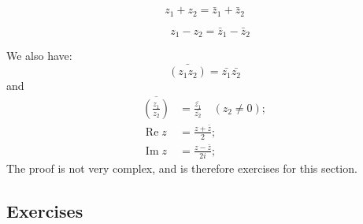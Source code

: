 \documentclass[
	12pt, %
	fleqn, %
	a4paper, %
]{LegrandOrangeBook}
\begin{document}
$$z_1 + z_2 = \bar{z}_1 + \bar{z}_2$$

$$\quad z_1 - z_2 = \bar{z}_1 - \bar{z}_2$$

We also have:
$$\bar{(z_1z_2)} = \bar{z_1} \bar{z_2}$$
and
$$\begin{aligned}\overline{\left(\frac{z_1}{z_2}\right)}&=\frac{\bar{z_1}}{\bar{z_2}}\quad(z_2\neq0);\\\operatorname{Re}z&=\frac{z+\bar{z}}2;\\\operatorname{Im}z&=\frac{z-\bar{z}}{2i};\end{aligned}$$
The proof is not very complex, and is therefore exercises for this section.
\\
\subsection{Exercises}
\end{document}
